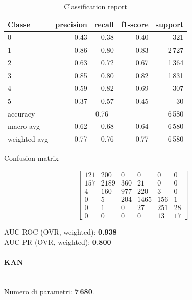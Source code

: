 \documentclass[a4paper,12pt]{report}
\begin{document}
	\begin{table}[H]
		\centering
		\caption{Classification report}
		\label{tab:cr_mlp}
		\begin{tabular}{lrrrr}
			\toprule
			Classe & precision & recall & f1-score & support \\
			\midrule
			0 & 0.43 & 0.38 & 0.40 & 321 \\
			1 & 0.86 & 0.80 & 0.83 & 2\,727 \\
			2 & 0.63 & 0.72 & 0.67 & 1\,364 \\
			3 & 0.85 & 0.80 & 0.82 & 1\,831 \\
			4 & 0.59 & 0.82 & 0.69 & 307 \\
			5 & 0.37 & 0.57 & 0.45 & 30 \\
			\midrule
			accuracy & \multicolumn{3}{c}{0.76} & 6\,580 \\
			macro avg & 0.62 & 0.68 & 0.64 & 6\,580 \\
			weighted avg & 0.77 & 0.76 & 0.77 & 6\,580 \\
			\bottomrule
		\end{tabular}
	\end{table}
	
	\begin{table}[H]
		\centering
		\caption{Confusion matrix}
		\label{tab:cm_mlp}
		\[
		\begin{bmatrix}
			121 & 200 & 0   & 0   & 0   & 0   \\
			157 & 2189& 360 & 21  & 0   & 0   \\
			4   & 160 & 977 & 220 & 3   & 0   \\
			0   & 5   & 204 & 1465& 156 & 1   \\
			0   & 1   & 0   & 27  & 251 & 28  \\
			0   & 0   & 0   & 0   & 13  & 17
		\end{bmatrix}
		\]
		\vspace{1mm}
		
		AUC-ROC (OVR, weighted): \textbf{0.938} \\
		AUC-PR  (OVR, weighted): \textbf{0.800}
	\end{table}
	
	
	\paragraph{KAN} \mbox{}\\
	Numero di parametri: \textbf{7\,680}.
	
\end{document}
